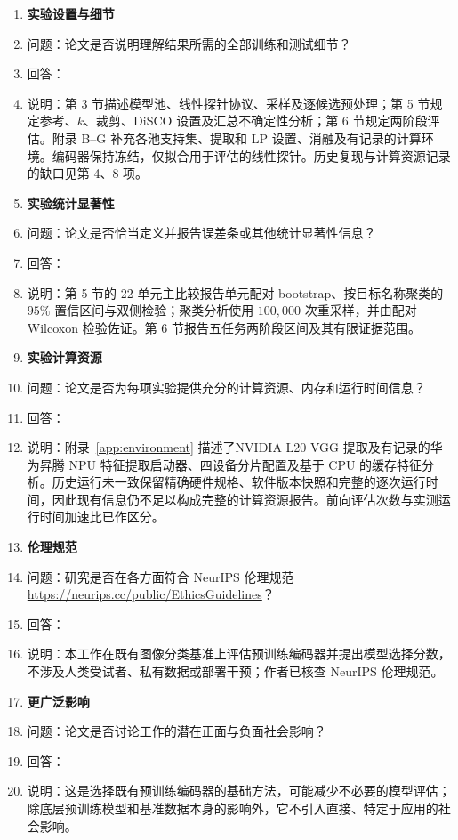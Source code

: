 \begin{enumerate}
\item \textbf{实验设置与细节}
\item[] 问题：论文是否说明理解结果所需的全部训练和测试细节？
\item[] 回答：\answerYes{}
\item[] 说明：第 3 节描述模型池、线性探针协议、采样及逐候选预处理；第 5 节规定参考、$k$、裁剪、DiSCO 设置及汇总不确定性分析；第 6 节规定两阶段评估。附录 B--G 补充各池支持集、提取和 LP 设置、消融及有记录的计算环境。编码器保持冻结，仅拟合用于评估的线性探针。历史复现与计算资源记录的缺口见第 4、8 项。

\item \textbf{实验统计显著性}
\item[] 问题：论文是否恰当定义并报告误差条或其他统计显著性信息？
\item[] 回答：\answerYes{}
\item[] 说明：第 5 节的 22 单元主比较报告单元配对 bootstrap、按目标名称聚类的 $95\%$ 置信区间与双侧检验；聚类分析使用 $100{,}000$ 次重采样，并由配对 Wilcoxon 检验佐证。第 6 节报告五任务两阶段区间及其有限证据范围。

\item \textbf{实验计算资源}
\item[] 问题：论文是否为每项实验提供充分的计算资源、内存和运行时间信息？
\item[] 回答：\answerNo{}
\item[] 说明：附录~\ref{app:environment} 描述了NVIDIA L20 VGG 提取及有记录的华为昇腾 NPU 特征提取启动器、四设备分片配置及基于 CPU 的缓存特征分析。历史运行未一致保留精确硬件规格、软件版本快照和完整的逐次运行时间，因此现有信息仍不足以构成完整的计算资源报告。前向评估次数与实测运行时间加速比已作区分。

\item \textbf{伦理规范}
\item[] 问题：研究是否在各方面符合 NeurIPS 伦理规范 \url{https://neurips.cc/public/EthicsGuidelines}？
\item[] 回答：\answerYes{}
\item[] 说明：本工作在既有图像分类基准上评估预训练编码器并提出模型选择分数，不涉及人类受试者、私有数据或部署干预；作者已核查 NeurIPS 伦理规范。

\item \textbf{更广泛影响}
\item[] 问题：论文是否讨论工作的潜在正面与负面社会影响？
\item[] 回答：\answerNA{}
\item[] 说明：这是选择既有预训练编码器的基础方法，可能减少不必要的模型评估；除底层预训练模型和基准数据本身的影响外，它不引入直接、特定于应用的社会影响。


\end{enumerate}
